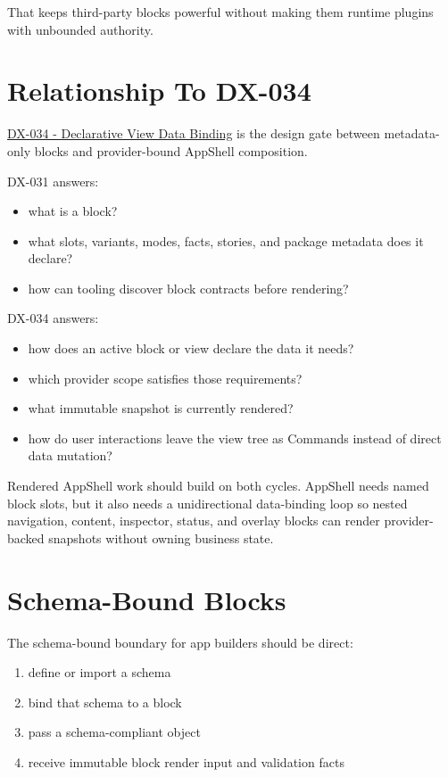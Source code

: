 That keeps third-party blocks powerful without making them runtime plugins with unbounded authority.

\section{Relationship To DX-034}\label{record-128-relationship-to-dx-034}

\href{https://github.com/flyingrobots/bijou/blob/cbd70612140e7a450d764b3c7be1c6af878b99bc/docs/design/DX-034-declarative-view-data-binding.md}{DX-034 - Declarative View Data Binding} is the design gate between metadata-only blocks and provider-bound AppShell composition.

DX-031 answers:

\begin{itemize}
\tightlist
\item
  what is a block?
\item
  what slots, variants, modes, facts, stories, and package metadata does it declare?
\item
  how can tooling discover block contracts before rendering?
\end{itemize}

DX-034 answers:

\begin{itemize}
\tightlist
\item
  how does an active block or view declare the data it needs?
\item
  which provider scope satisfies those requirements?
\item
  what immutable snapshot is currently rendered?
\item
  how do user interactions leave the view tree as Commands instead of direct data mutation?
\end{itemize}

Rendered AppShell work should build on both cycles. AppShell needs named block slots, but it also needs a unidirectional data-binding loop so nested navigation, content, inspector, status, and overlay blocks can render provider-backed snapshots without owning business state.

\section{Schema-Bound Blocks}\label{record-128-schema-bound-blocks}

The schema-bound boundary for app builders should be direct:

\begin{enumerate}
\def\labelenumi{\arabic{enumi}.}
\tightlist
\item
  define or import a schema
\item
  bind that schema to a block
\item
  pass a schema-compliant object
\item
  receive immutable block render input and validation facts
\end{enumerate}

